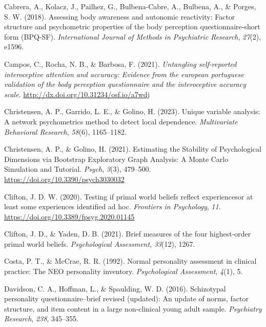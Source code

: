 \documentclass[
  man,
  floatsintext,
  longtable,
  nolmodern,
  notxfonts,
  notimes,
  colorlinks=true,linkcolor=blue,citecolor=blue,urlcolor=blue]{apa7}
\newlength{\cslhangindent}
\newenvironment{CSLReferences}[2] %
 {\begin{list}{}{%
  \setlength{\itemindent}{0pt}
  \setlength{\leftmargin}{0pt}
  \setlength{\parsep}{0pt}
  \ifodd #1
   \setlength{\leftmargin}{\cslhangindent}
   \setlength{\itemindent}{-1\cslhangindent}
  \fi
  \setlength{\itemsep}{#2\baselineskip}}}
 {\end{list}}
\begin{document}
\begin{CSLReferences}{1}{0}
Cabrera, A., Kolacz, J., Pailhez, G., Bulbena-Cabre, A., Bulbena, A., \&
Porges, S. W. (2018). Assessing body awareness and autonomic reactivity:
Factor structure and psychometric properties of the body perception
questionnaire-short form (BPQ-SF). \emph{International Journal of
Methods in Psychiatric Research}, \emph{27}(2), e1596.

Campos, C., Rocha, N. B., \& Barbosa, F. (2021). \emph{Untangling
self-reported interoceptive attention and accuracy: Evidence from the
european portuguese validation of the body perception questionnaire and
the interoceptive accuracy scale}.
\url{http://dx.doi.org/10.31234/osf.io/a7wdj}

Christensen, A. P., Garrido, L. E., \& Golino, H. (2023). Unique
variable analysis: A network psychometrics method to detect local
dependence. \emph{Multivariate Behavioral Research}, \emph{58}(6),
1165--1182.

Christensen, A. P., \& Golino, H. (2021). Estimating the Stability of
Psychological Dimensions via Bootstrap Exploratory Graph Analysis: A
Monte Carlo Simulation and Tutorial. \emph{Psych}, \emph{3}(3),
479--500. \url{https://doi.org/10.3390/psych3030032}

Clifton, J. D. W. (2020). Testing if primal world beliefs reflect
experiences{\textemdash}or at least some experiences identified ad hoc.
\emph{Frontiers in Psychology}, \emph{11}.
\url{https://doi.org/10.3389/fpsyg.2020.01145}

Clifton, J. D., \& Yaden, D. B. (2021). Brief measures of the four
highest-order primal world beliefs. \emph{Psychological Assessment},
\emph{33}(12), 1267.

Costa, P. T., \& McCrae, R. R. (1992). Normal personality assessment in
clinical practice: The NEO personality inventory. \emph{Psychological
Assessment}, \emph{4}(1), 5.

Davidson, C. A., Hoffman, L., \& Spaulding, W. D. (2016). Schizotypal
personality questionnaire--brief revised (updated): An update of norms,
factor structure, and item content in a large non-clinical young adult
sample. \emph{Psychiatry Research}, \emph{238}, 345--355.


\end{CSLReferences}
\end{document}
